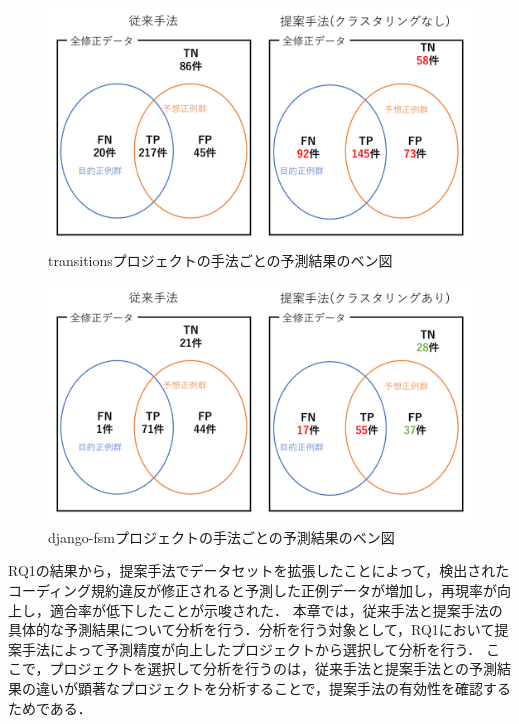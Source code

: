 \documentclass[11pt,dvipdfmx]{jreport}
\begin{document}
\begin{figure}[bp]
	\centering
	\includegraphics[width=1\linewidth]{Kameoka_fig/benzu-transitions.pdf}
	\caption{transitionsプロジェクトの手法ごとの予測結果のベン図}
	\label{fig:transitions}
\end{figure}
\begin{figure}[bp]

	\centering
	\includegraphics[width=1\linewidth]{Kameoka_fig/benzu-django-fsm.pdf}
	\caption{django-fsmプロジェクトの手法ごとの予測結果のベン図}
	\label{fig:django-fsm}
\end{figure}

RQ1の結果から，提案手法でデータセットを拡張したことによって，検出されたコーディング規約違反が修正されると予測した正例データが増加し，再現率が向上し，適合率が低下したことが示唆された．
本章では，従来手法と提案手法の具体的な予測結果について分析を行う．分析を行う対象として，RQ1において提案手法によって予測精度が向上したプロジェクトから選択して分析を行う．
ここで，プロジェクトを選択して分析を行うのは，従来手法と提案手法との予測結果の違いが顕著なプロジェクトを分析することで，提案手法の有効性を確認するためである．
\end{document}
